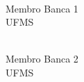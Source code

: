\begin{minipage}{0.5\textwidth}
    \begin{center}
    \begin{minipage}{7cm}
        \hrulefill
    \end{minipage}\\
    Membro Banca 1\\
    UFMS
    \end{center}
\end{minipage}
\hfill
\begin{minipage}{0.5\textwidth}
    \begin{center}
    \begin{minipage}{7cm}
        \hrulefill
    \end{minipage}\\
    Membro Banca 2\\
    UFMS
    \end{center}
\end{minipage}
\vfill{}
\begin{center}
    \thedate
\end{center}

